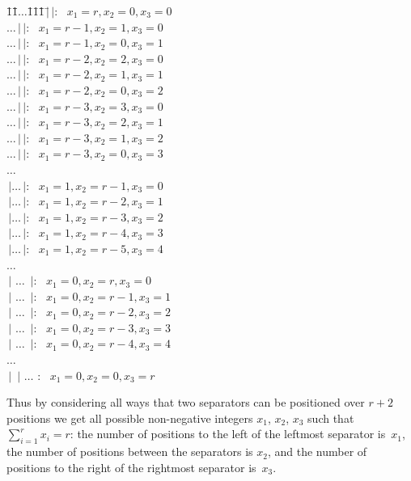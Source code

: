 \documentclass[titlepage]{article}
\theoremstyle{definition}
\numberwithin{equation}{subsection}
\numberwithin{remark}{subsection}
\begin{document}
{\small{
\begin{tabbing}
\hspace*{50pt}\=1\=1\=$\ldots$\=1\=1\=1\=$\,|$\=$\,|$: $\,\,\,x_1=r, x_2=0, x_3=0$\\
\>$\ldots$\>$\,|$\>$\,|$: $\,\,\,x_1=r-1, x_2=1, x_3=0$\\
\>$\ldots$\>$\,|$\>$\,|$: $\,\,\,x_1=r-1, x_2=0, x_3=1$\\
\>$\ldots$\>$\,|$\>$\,|$: $\,\,\,x_1=r-2, x_2=2, x_3=0$\\
\>$\ldots$\>$\,|$\>$\,|$: $\,\,\,x_1=r-2, x_2=1, x_3=1$\\
\>$\ldots$\>$\,|$\>$\,|$: $\,\,\,x_1=r-2, x_2=0, x_3=2$\\
\>$\ldots$\>$\,|$\>$\,|$: $\,\,\,x_1=r-3, x_2=3, x_3=0$\\
\>$\ldots$\>$\,|$\>$\,|$: $\,\,\,x_1=r-3, x_2=2, x_3=1$\\
\>$\ldots$\>$\,|$\>$\,|$: $\,\,\,x_1=r-3, x_2=1, x_3=2$\\
\>$\ldots$\>$\,|$\>$\,|$: $\,\,\,x_1=r-3, x_2=0, x_3=3$\\
\>\>\>$\ldots$\\
\>$\,|$\>$\ldots$\>$\,|$: $\,\,\,x_1=1, x_2=r-1, x_3=0$\\
\>$\,|$\>$\ldots$\>$\,|$: $\,\,\,x_1=1, x_2=r-2, x_3=1$\\
\>$\,|$\>$\ldots$\>$\,|$: $\,\,\,x_1=1, x_2=r-3, x_3=2$\\
\>$\,|$\>$\ldots$\>$\,|$: $\,\,\,x_1=1, x_2=r-4, x_3=3$\\
\>$\,|$\>$\ldots$\>$\,|$: $\,\,\,x_1=1, x_2=r-5, x_3=4$\\
\>\>\>$\ldots$\\
\>$\,|$    \>$\ldots$        \>$\,|$: $\,\,\,x_1=0, x_2=r, x_3=0$\\
\>$\,|$    \>$\ldots$        \>$\,|$: $\,\,\,x_1=0, x_2=r-1, x_3=1$\\
\>$\,|$    \>$\ldots$     \>$\,|$: $\,\,\,x_1=0, x_2=r-2, x_3=2$\\
\>$\,|$    \>$\ldots$    \>$\,|$: $\,\,\,x_1=0, x_2=r-3, x_3=3$\\
\>$\,|$    \>$\ldots$ \>$\,|$: $\,\,\,x_1=0, x_2=r-4, x_3=4$\\
\>\>\>$\ldots$\\
\>$\,|$  \>$\,|$  \>$\ldots$ : $\,\,\,x_1=0, x_2=0, x_3=r$
\end{tabbing}}}
\par\noindent
Thus by considering all ways that two separators can be positioned over $r+2$ positions we get all possible non-negative integers $x_1$, $x_2$, $x_3$ such that $\sum_{i=1}^rx_i=r$: the number of positions to the left of the leftmost separator is~$x_1$, the number of positions between the separators is $x_2$, and the number of positions to the right of the rightmost separator is~$x_3$.
\end{document}
